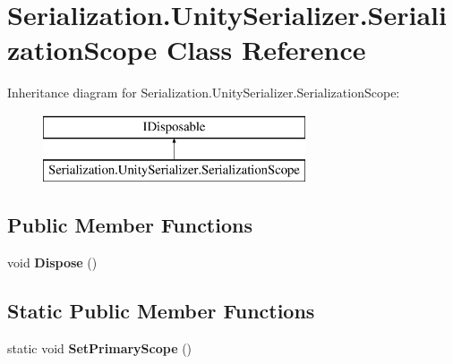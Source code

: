 \hypertarget{class_serialization_1_1_unity_serializer_1_1_serialization_scope}{}\section{Serialization.\+Unity\+Serializer.\+Serialization\+Scope Class Reference}
\label{class_serialization_1_1_unity_serializer_1_1_serialization_scope}
Inheritance diagram for Serialization.\+Unity\+Serializer.\+Serialization\+Scope\+:\begin{figure}[H]
\begin{center}
\leavevmode
\includegraphics[height=2.000000cm]{class_serialization_1_1_unity_serializer_1_1_serialization_scope}
\end{center}
\end{figure}
\subsection*{Public Member Functions}
\begin{DoxyCompactItemize}
\item 
\mbox{\label{class_serialization_1_1_unity_serializer_1_1_serialization_scope_ac05852f2bd6c717194fff02bf062138e}} 
void {\bfseries Dispose} ()
\end{DoxyCompactItemize}
\subsection*{Static Public Member Functions}
\begin{DoxyCompactItemize}
\item 
\mbox{\label{class_serialization_1_1_unity_serializer_1_1_serialization_scope_a20b9e60c200484505ab164f69491845d}} 
static void {\bfseries Set\+Primary\+Scope} ()
\end{DoxyCompactItemize}
